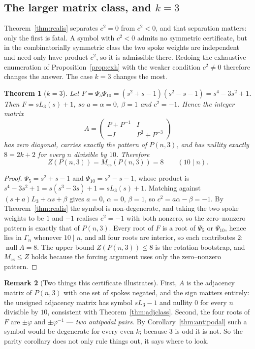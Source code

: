 \documentclass[11pt]{article}
\newtheorem{theorem}{Theorem}
\theoremstyle{definition}
\newtheorem{remark}[theorem]{Remark}
\begin{document}
\subsection*{The larger matrix class, and $k=3$}
Theorem~\ref{thm:realis} separates $c^{2}=0$ from $c^{2}<0$, and that
separation matters: only the first is fatal. A symbol with $c^{2}<0$ admits no
symmetric certificate, but in the combinatorially symmetric class the two spoke
weights are independent and need only have product $c^{2}$, so it is admissible
there. Redoing the exhaustive enumeration of Proposition~\ref{prop:exh} with
the weaker condition $c^{2}\ne0$ therefore changes the answer. The case $k=3$
changes the most.

\begin{theorem}[$k=3$]\label{thm:k3}
Let $F=\Psi_5\Psi_{10}=(s^{2}+s-1)(s^{2}-s-1)=s^{4}-3s^{2}+1$. Then
$F=sL_3(s)+1$, so $a=\alpha=0$, $\beta=1$ and $c^{2}=-1$. Hence the integer
matrix
\[
  A=\begin{pmatrix} P+P^{-1} & I\\ -I & P^{3}+P^{-3}\end{pmatrix}
\]
has zero diagonal, carries exactly the pattern of $P(n,3)$, and has nullity
exactly $8=2k+2$ for every $n$ divisible by $10$. Therefore
\[
  Z(P(n,3))=M_{\mathrm{cs}}(P(n,3))=8 \qquad (10\mid n).
\]
\end{theorem}

\begin{proof}
$\Psi_5=s^{2}+s-1$ and $\Psi_{10}=s^{2}-s-1$, whose product is
$s^{4}-3s^{2}+1=s(s^{3}-3s)+1=sL_3(s)+1$. Matching against
$(s+a)L_3+\alpha s+\beta$ gives $a=0$, $\alpha=0$, $\beta=1$, so
$c^{2}=a\alpha-\beta=-1$. By Theorem~\ref{thm:realis} the symbol is
non-degenerate, and taking the two spoke weights to be $1$ and $-1$ realises
$c^{2}=-1$ with both nonzero, so the zero--nonzero pattern is exactly that of
$P(n,3)$. Every root of $F$ is a root of $\Psi_5$ or $\Psi_{10}$, hence lies in
$\Gamma_n$ whenever $10\mid n$, and all four roots are interior, so each
contributes $2$: $\operatorname{null}A=8$. The upper bound
$Z(P(n,3))\le 8$ is the rotation bootstrap, and $M_{\mathrm{cs}}\le Z$ holds
because the forcing argument uses only the zero--nonzero pattern.
\end{proof}

\begin{remark}[Two things this certificate illustrates]
First, $A$ is the adjacency matrix of $P(n,3)$ with one set of spokes negated,
and the sign matters entirely: the unsigned adjacency matrix has symbol
$sL_3-1$ and nullity $0$ for every $n$ divisible by $10$, consistent with
Theorem~\ref{thm:adjclass}. Second, the four roots of $F$ are
$\pm\varphi$ and $\pm\varphi^{-1}$ --- \emph{two antipodal pairs}. By
Corollary~\ref{thm:antipodal} such a symbol would be degenerate for every even
$k$; because $3$ is odd it is not. So the parity corollary does not only rule
things out, it says where to look.
\end{remark}
\end{document}

